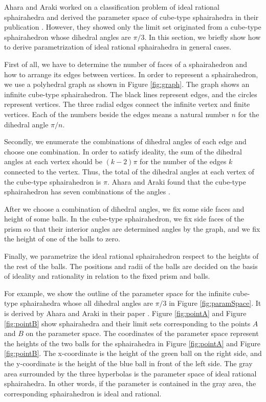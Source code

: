 \noindent
Ahara and Araki worked on a classification problem of ideal rational
sphairahedra and derived the parameter space of cube-type
sphairahedra in their publication
\cite{ahara2003sphairahedral}.
However, they showed only the limit set originated from a cube-type
sphairahedron whose dihedral angles are $\pi / 3$.
In this section, we briefly show how to derive parametrization of ideal
rational sphairahedra in general cases.

First of all, we have to determine the number of faces of a sphairahedron
and how to arrange its edges between vertices.
In order to represent a sphairahedron, we use a polyhedral graph as
shown in Figure \ref{fig:graph}.
The graph shows an infinite cube-type sphairahedron.
The black lines represent edges, and the circles represent vertices.
The three radial edges connect the infinite vertex and finite vertices.
Each of the numbers beside the edges means a natural number $n$ for the
dihedral angle $\pi / n$.

Secondly, we enumerate the combinations of dihedral angles of each edge and
choose one combination.
In order to satisfy ideality, the sum of the dihedral angles at each vertex
should be $(k - 2)\pi$ for the number of the edges $k$ connected to the
vertex.
Thus, the total of the dihedral angles at each vertex of the cube-type
sphairahedron is $\pi$. Ahara and Araki found that the cube-type
sphairahedron has seven combinations of the angles
\cite{ahara2003sphairahedral}.

After we choose a combination of dihedral angles, we fix some side
faces and height of some balls.
In the cube-type sphairahedron, we fix side faces
of the prism so that their interior angles are determined
angles by the graph, and we fix the height of one of the balls to zero.

Finally, we parametrize the ideal rational sphairahedron respect to the
heights of the rest of the balls.
The positions and radii of the balls are decided on the basis of
ideality and rationality in relation to the fixed prism and
balls.

For example, we show the outline of the parameter space for the infinite
cube-type sphairahedra whose all dihedral angles are $\pi / 3$ in Figure
\ref{fig:paramSpace}.
It is derived by Ahara and Araki in their paper
\cite{ahara2003sphairahedral}.
Figure \ref{fig:pointA} and Figure \ref{fig:pointB} show sphairahedra
and their limit sets corresponding to the points $A$ and $B$ on the
parameter space.
The coordinates of the parameter space represent the heights of the two
balls for the sphairahedra in Figure
\ref{fig:pointA} and Figure
\ref{fig:pointB}.
The x-coordinate is the height of the green ball on the right side, and
the y-coordinate is the height of the blue ball in front of
the left side.
The gray area surrounded by the three hyperbolas is the
parameter space of ideal rational sphairahedra.
In other words, if the parameter is contained in the gray area,
the corresponding sphairahedron is ideal and rational.

